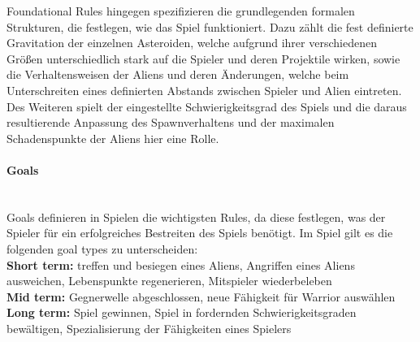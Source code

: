 \documentclass[11pt]{scrartcl}
\newcommand{\lbparagraph}[1]{\paragraph*{#1}\mbox{}\\}
\begin{document}
Foundational Rules hingegen spezifizieren die grundlegenden formalen Strukturen, die festlegen, wie das Spiel funktioniert\cite{K2011}. Dazu zählt die fest definierte Gravitation der einzelnen Asteroiden, welche aufgrund ihrer verschiedenen Größen unterschiedlich stark auf die Spieler und deren Projektile wirken, sowie die Verhaltensweisen der Aliens und deren Änderungen, welche beim Unterschreiten eines definierten Abstands zwischen Spieler und Alien eintreten. Des Weiteren spielt der eingestellte Schwierigkeitsgrad des Spiels und die daraus resultierende Anpassung des Spawnverhaltens und der maximalen Schadenspunkte der Aliens hier eine Rolle.
\lbparagraph{Goals}
Goals definieren in Spielen die wichtigsten Rules, da diese festlegen, was der Spieler für ein erfolgreiches Bestreiten des Spiels benötigt\cite[~p.145]{S2014}. Im Spiel gilt es die folgenden goal types zu unterscheiden: \\
\textbf{Short term:} treffen und besiegen eines Aliens, Angriffen eines Aliens ausweichen, Lebenspunkte regenerieren, Mitspieler wiederbeleben \\
\textbf{Mid term:} Gegnerwelle abgeschlossen, neue Fähigkeit für Warrior auswählen \\
\textbf{Long term:} Spiel gewinnen, Spiel in fordernden Schwierigkeitsgraden bewältigen, Spezialisierung der Fähigkeiten eines Spielers
\end{document}
